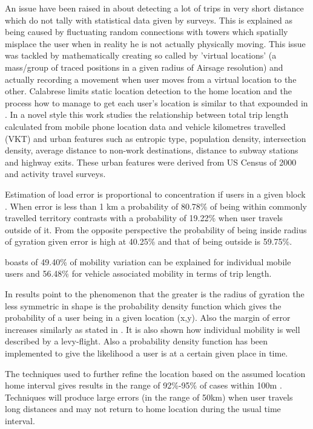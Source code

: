 \documentclass[12pt, a4paper]{report}
\theoremstyle{definition}
\theoremstyle{definition}%
\theoremstyle{definition}%
\theoremstyle{definition}%
\theoremstyle{definition}%
\theoremstyle{definition}%
\begin{document}
An issue have been raised in \cite{Calabrese2013} about detecting a lot of trips in very short distance which do not tally with statistical data given by surveys. This is explained as being caused by fluctuating random connections with towers which spatially misplace the user when in reality he is not actually physically moving. This issue was tackled by mathematically creating so called by \cite{Calabrese2013} 'virtual locations' (a mass/group of traced positions in a given radius of Airsage resolution) and actually recording a movement when user moves from a virtual location to the other. Calabrese limits static location detection to the home location and the process how to manage to get each user's location is similar to that expounded in \cite{Hoteit2016}. In a novel style this work studies the relationship between total trip length calculated from mobile phone location data and vehicle kilometres travelled (VKT) and urban features such as entropic type, population density, intersection density, average distance to non-work destinations, distance to subway stations and highway exits. These urban features were derived from US Census of 2000 and activity travel surveys.

Estimation of load error is proportional to concentration if users in a given block \cite{Hoteit2014}. When error is less than 1 km a probability of 80.78\% of being within commonly travelled territory contrasts with a probability of 19.22\% when user travels outside of it. From the opposite perspective the probability of being inside radius of gyration given error is high at 40.25\% and that of being outside is 59.75\%.

\cite{Calabrese2013} boasts of 49.40\% of mobility variation can be explained for individual mobile users and 56.48\% for vehicle associated mobility in terms of trip length.    

In \cite{Gonzalez2008} results point to the phenomenon that the greater is the radius of gyration the less symmetric in shape is the probability density function which gives the probability of a user being in a given location (x,y). Also the margin of error increases similarly as stated in \cite{Hoteit2014}. It is also shown how individual mobility is well described by a levy-flight. Also a probability density function has been implemented to give the likelihood a user is at a certain given place in time.

The techniques used to further refine the location based on the assumed location home interval gives results in the range of 92\%-95\% of cases within 100m \cite{Hoteit2016}. Techniques will produce large errors (in the range of 50km) when user travels long distances and may not return to home location during the usual time interval.
\end{document}

